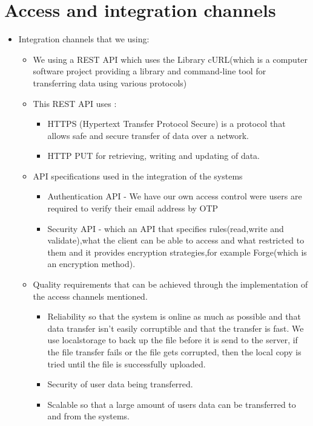 \documentclass[a4paper,12pt]{article}
\begin{document}
\section{Access and integration channels}
\begin{itemize}
\item Integration channels that we using:
\begin{itemize}
\item We using a REST API which uses the Library cURL(which is a computer software project providing a library and command-line tool for transferring data using various protocols)

\item This REST API uses : 
\begin{itemize}
\item HTTPS (Hypertext Transfer Protocol Secure) is a protocol that allows safe and secure transfer of data over a network.
\item HTTP PUT for retrieving, writing and updating of data.
\end{itemize}

\item API specifications used in the integration of the systems
\begin{itemize}
\item Authentication API - We have our own access control were users are required to verify their email address by OTP
\item Security API - which an API that specifies rules(read,write and validate),what the client can be able to access and what restricted to them and it provides encryption strategies,for example Forge(which is an encryption method).
\end{itemize}

\item Quality requirements that can be achieved through the implementation of the access channels mentioned.
\begin{itemize}
\item Reliability so that the system is online as much as possible and that data transfer isn’t easily corruptible and that the transfer is fast. We use localstorage to back up the file before it is send to the server, if the file transfer fails or the file gets corrupted, then the local copy is tried until the file is successfully uploaded.

\item Security of user data being transferred.

\item Scalable so that a large amount of users data can be transferred to and from the systems.


\end{itemize}
\end{itemize}
\end{itemize}
\end{document}
